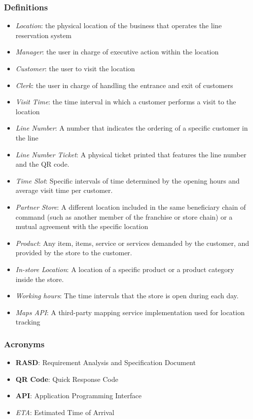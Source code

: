 \subsubsection{Definitions}
\begin{itemize}
    \item \textit{Location}: the physical location of the business that operates the line reservation system
    \item \textit{Manager}: the user in charge of executive action within the location
    \item \textit{Customer}: the user to visit the location
    \item \textit{Clerk}: the user in charge of handling the entrance and exit of customers
    \item \textit{Visit Time}: the time interval in which a customer performs a visit to the location
    \item \textit{Line Number}: A number that indicates the ordering of a specific customer in the line
    \item \textit{Line Number Ticket}: A physical ticket printed that features the line number and the QR code.
    \item \textit{Time Slot}: Specific intervals of time determined by the opening hours and average visit time per customer.
    \item \textit{Partner Store}: A different location included in the same beneficiary chain of command (such as another member of the franchise or store chain) or a mutual agreement with the specific location
    \item \textit{Product}: Any item, items, service or services demanded by the customer, and provided by the store to the customer.
    \item \textit{In-store Location}: A location of a specific product or a product category inside the store.
    \item \textit{Working hours}: The time intervals that the store is open during each day.
    \item \textit{Maps API}: A third-party mapping service implementation used for location tracking
\end{itemize}
\subsubsection{Acronyms}
\begin{itemize}
    \item \textbf{RASD}: Requirement Analysis and Specification Document
    \item \textbf{QR Code}: Quick Response Code
    \item \textbf{API}: Application Programming Interface
    \item \textit{ETA}: Estimated Time of Arrival
\end{itemize}
